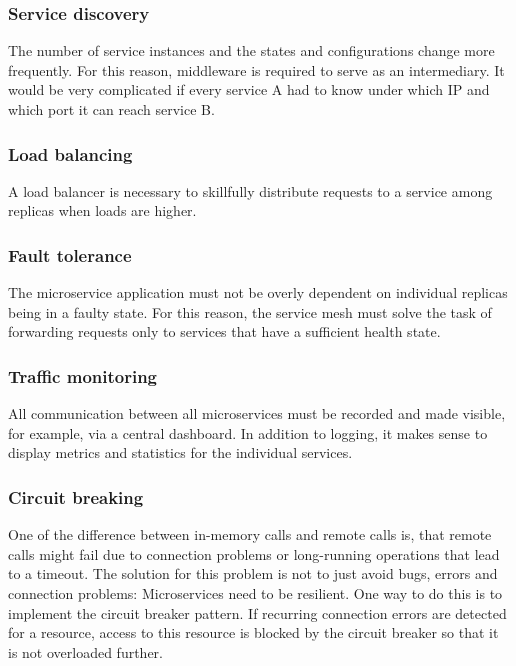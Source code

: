\subsubsection{Service discovery}

The number of service instances and the states and configurations change more frequently. For this reason, middleware is required to serve as an intermediary. It would be very complicated if every service A had to know under which IP and which port it can reach service B.

\subsubsection{Load balancing}

A load balancer is necessary to skillfully distribute requests to a service among replicas when loads are higher.

\subsubsection{Fault tolerance}

The microservice application must not be overly dependent on individual replicas being in a faulty state. For this reason, the service mesh must solve the task of forwarding requests only to services that have a sufficient health state.

\subsubsection{Traffic monitoring}

All communication between all microservices must be recorded and made visible, for example, via a central dashboard. In addition to logging, it makes sense to display metrics and statistics for the individual services.

\subsubsection{Circuit breaking}
One of the difference between in-memory calls and remote calls is, that remote calls might fail due to connection problems or long-running operations that lead to a timeout. The solution for this problem is not to just avoid bugs, errors and connection problems: Microservices need to be resilient. One way to do this is to implement the circuit breaker pattern. If recurring connection errors are detected for a resource, access to this resource is blocked by the circuit breaker so that it is not overloaded further.

